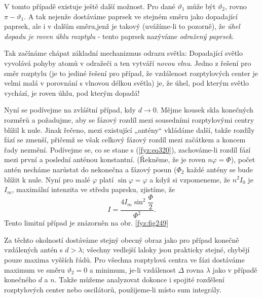 {    V tomto případě existuje ještě další možnost. Pro dané \(\vartheta_1\) může být 
    \(\vartheta_2\), rovno \(\pi-\vartheta_1\). A tak nejenže dostáváme paprsek ve stejném směru 
    jako dopadající paprsek, ale i v dalším směru,jenž je takový (uvážíme-li to pozorně), že 
    \emph{úhel dopadu je roven úhlu rozptylu} - tento paprsek nazýváme \emph{odražený paprsek}.
    
    Tak začínáme chápat základní mechanizmus odrazu světla: Dopadající světlo vyvolává pohyby atomů 
    v odražeči a ten vytváří \emph{novou vlnu}. Jedno z řešení pro směr rozptylu (je to jediné 
    řešení pro případ, že vzdálenost rozptylových center je velmi malá v porovnání s vlnovou délkou 
    světla) je, že úhel, pod kterým světlo vychází, je roven úhlu, pod kterým dopadá!
    
    Nyní se podívejme na zvláštní případ, kdy \(d\rightarrow 0\). Mějme kousek skla konečných 
    rozměrů a požadujme, aby se fázový rozdíl mezi sousedními rozptylovými centry blížil k nule. 
    Jinak řečeno, mezi existující „antény“ vkládáme další, takže rozdíly fází se zmenší, přičemž se 
    však celkový fázový rozdíl mezi začátkem a koncem řady nezmění. Podívejme se, co se stane s 
    (\ref{fyz:eq320}), zachováme-li rozdíl fází mezi první a poslední anténou konstantní. (Řekněme, 
    že je roven \(n\varphi = \Phi\)), počet antén necháme narůstat do nekonečna a fázový posun 
    (\(\Phi_2\) každé antény se bude blížit k nule. Nyní pro malé \(\varphi\) platí 
    \(\sin\varphi=\varphi\) a když si vzpomeneme, že \(n^2I_0\) je \(I_m\), maximální intenzita ve 
    středu paprsku, zjistíme, že
    \begin{equation}\label{fyz:eq325}
      I = \frac{4I_m\sin^2\dfrac{\Phi}{2}}{\Phi^2}.
    \end{equation}
    Tento limitní případ je znázorněn na obr. \ref{fyz:fig249}
    
    Za těchto okolností dostáváme stejný obecný obraz jako pro případ konečně vzdálených antén s 
    \(d > \lambda\); všechny vedlejší laloky jsou prakticky stejné, chybějí pouze maxima vyšších 
    řádů. Pro všechna rozptylová centra ve fázi dostáváme maximum ve směru \(\vartheta_2 = 0\) a 
    minimum, je-li vzdálenost \(\Delta\) rovna \(\lambda\) jako v případě konečného \(d\) a \(n\). 
    Takže můžeme analyzovat dokonce i spojité rozdělení rozptylových center nebo oscilátorů, 
    použijeme-li místo sum integrály.
    
}
